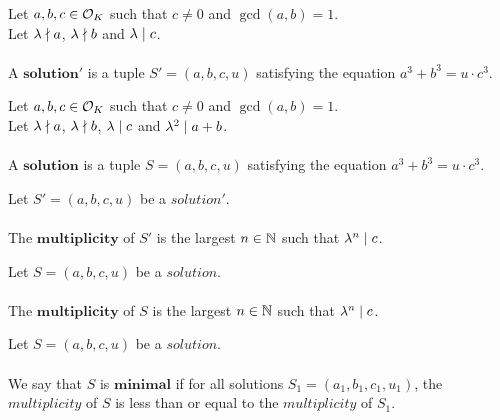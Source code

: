 \begin{definition}[Solution']
    \label{def:Solution1}
    \leanok
    Let $a, b, c \in \mathcal{O}_K$ such that $c \neq 0$ and $\gcd(a,b)=1$.\\
    Let $\lambda \nmid a$, $\lambda \nmid b$ and $\lambda \mid c$. \\\\
    A $\boldsymbol{solution'}$ is a tuple $S'=(a, b, c, u)$
    satisfying the equation $a^3 + b^3 = u \cdot c^3.$
\end{definition}

\begin{definition}[Solution]
    \label{def:Solution}
    \leanok
    Let $a, b, c \in \mathcal{O}_K$ such that $c \neq 0$ and $\gcd(a,b)=1$.\\
    Let $\lambda \nmid a$, $\lambda \nmid b$, $\lambda \mid c$ and
    $\lambda^2 \mid a+b$. \\\\
    A $\boldsymbol{solution}$ is a tuple $S=(a, b, c, u)$
    satisfying the equation $a^3 + b^3 = u \cdot c^3$.
\end{definition}

\begin{definition}
    \label{def:Solution1_Multiplicity}
    \leanok
    Let $S'=(a, b, c, u)$ be a $solution'$. \\\\
    The $\boldsymbol{multiplicity}$ of $S'$ is the largest $n \in \mathbb{N}$ such that
    $\lambda^n \mid c$.
\end{definition}

\begin{definition}
    \label{def:Solution_Multiplicity}
    \leanok
    Let $S=(a, b, c, u)$ be a $solution$. \\\\
    The $\boldsymbol{multiplicity}$ of $S$ is the largest $n \in \mathbb{N}$ such that
    $\lambda^n \mid c$.
\end{definition}

\begin{definition}
    \label{def:Solution_Minimal}
    \leanok
    Let $S=(a, b, c, u)$ be a $solution$. \\\\
    We say that $S$ is $\boldsymbol{minimal}$ if for all solutions $S_1=(a_1,b_1,c_1,u_1)$,
    the $multiplicity$ of $S$ is less than or equal to the $multiplicity$ of $S_1$.
\end{definition}


